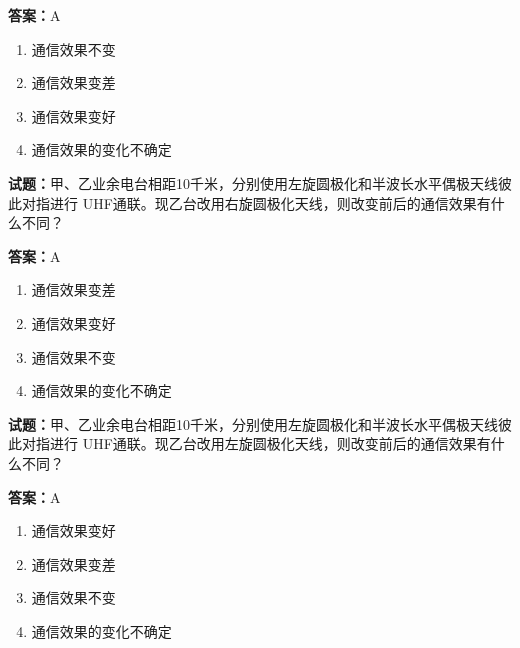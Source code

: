 \documentclass{ctexbook}
\begin{document}
\textbf{答案：}A 

\begin{enumerate}[leftmargin=3em]
  \item 通信效果不变 

  \item 通信效果变差 

  \item 通信效果变好 

  \item 通信效果的变化不确定 

\end{enumerate}






\vspace{1em}

\textbf{试题：}甲、乙业余电台相距10千米，分别使用左旋圆极化和半波长水平偶极天线彼此对指进行
UHF通联。现乙台改用右旋圆极化天线，则改变前后的通信效果有什么不同？ 

\textbf{答案：}A 

\begin{enumerate}[leftmargin=3em]
  \item 通信效果变差 

  \item 通信效果变好 

  \item 通信效果不变 

  \item 通信效果的变化不确定 

\end{enumerate}





\vspace{1em}

\textbf{试题：}甲、乙业余电台相距10千米，分别使用左旋圆极化和半波长水平偶极天线彼此对指进行
UHF通联。现乙台改用左旋圆极化天线，则改变前后的通信效果有什么不同？ 

\textbf{答案：}A 

\begin{enumerate}[leftmargin=3em]
  \item 通信效果变好 

  \item 通信效果变差 

  \item 通信效果不变 

  \item 通信效果的变化不确定 

\end{enumerate}
\end{document}
